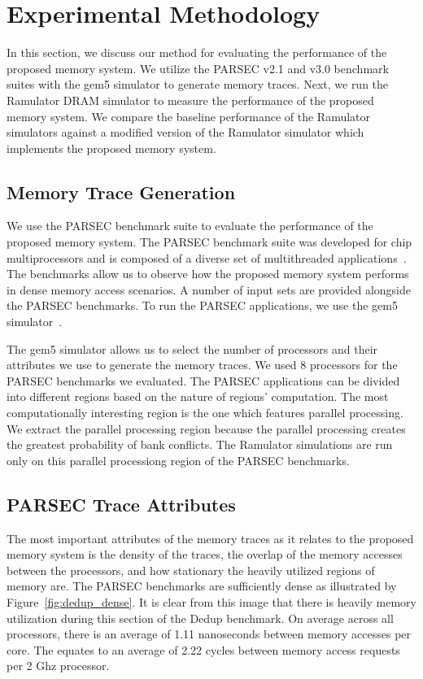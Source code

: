 \section{Experimental Methodology}
\label{sec:experimentalmethodology}

In this section, we discuss our method for evaluating the performance of the proposed memory system. We utilize the PARSEC v2.1 and v3.0 benchmark suites with the gem5 simulator to generate memory traces. Next, we run the Ramulator DRAM simulator to measure the performance of the proposed memory system. We compare the baseline performance of the Ramulator simulators against a modified version of the Ramulator simulator which implements the proposed memory system.

\subsection{Memory Trace Generation}

We use the PARSEC benchmark suite to evaluate the performance of the proposed memory system. The PARSEC benchmark suite was developed for chip multiprocessors and is composed of a diverse set of multithreaded applications~\cite{bienia09parsec2}. The benchmarks allow us to observe how the proposed memory system performs in dense memory access scenarios. A number of input sets are provided alongside the PARSEC benchmarks. To run the PARSEC applications, we use the gem5 simulator~\cite{parsec_2_1_m5}.

The gem5 simulator allows us to select the number of processors and their attributes we use to generate the memory traces. We used 8 processors for the PARSEC benchmarks we evaluated. The PARSEC applications can be divided into different regions based on the nature of regions' computation. The most computationally interesting region is the one which features parallel processing. We extract the parallel processing region because the parallel processing creates the greatest probability of bank conflicts. The Ramulator simulations are run only on this parallel processiong region of the PARSEC benchmarks.

\subsection{PARSEC Trace Attributes}

The most important attributes of the memory traces as it relates to the proposed memory system is the density of the traces, the overlap of the memory accesses between the processors, and how stationary the heavily utilized regions of memory are. The PARSEC benchmarks are sufficiently dense as illustrated by Figure~\ref{fig:dedup_dense}. It is clear from this image that there is heavily memory utilization during this section of the Dedup benchmark. On average across all processors, there is an average of 1.11 nanoseconds between memory accesses per core. The equates to an average of 2.22 cycles between memory access requests per 2 Ghz processor. 

